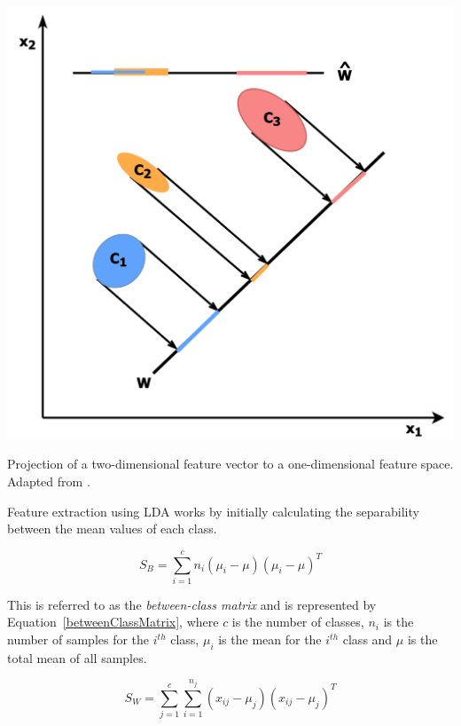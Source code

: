 \begin{marginfigure}
	\includegraphics{graphics/dimensionality_reduction/DimensionalityReductionLDA.png}
	\caption{
		Projection of a two-dimensional feature vector to a one-dimensional feature space. Adapted from \citet{Sharma2015}.
	}
	\label{fig:dimensionalityReduction}
  \end{marginfigure}

Feature extraction using LDA \citep{Sharma2015,Huang2002} works by initially calculating the separability between the mean values of each class.

\begin{equation}
	\label{betweenClassMatrix}
	S_B = \sum^{c}_{i=1}n_{i}(\mu_i - \mu)(\mu_i - \mu)^T
	\end{equation}

This is referred to as the \textit{between-class matrix} and is represented by Equation~\ref{betweenClassMatrix}, where $c$ is the number of classes, $n_i$ is the number of samples for the $i^{th}$ class, $\mu_i$ is the mean for the $i^{th}$ class and $\mu$ is the total mean of all samples.

\begin{equation}
	\label{distanceBetweenMeanAndSampleMatrix}
	S_W = \sum^{c}_{j=1}\sum^{n_j}_{i=1}(x_{ij} - \mu_j)(x_{ij} - \mu_j)^T
	\end{equation}

